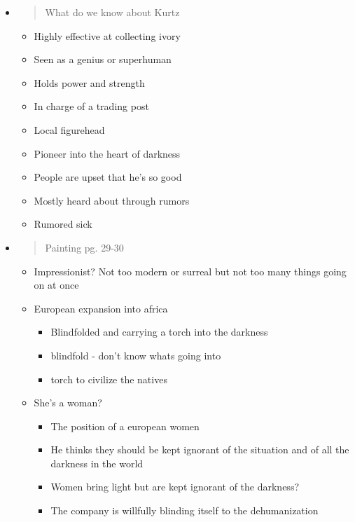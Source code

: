 \documentclass[letterpaper]{article}
\begin{document}
\begin{itemize}
\item \begin{quote}
What do we know about Kurtz
\end{quote}

\begin{itemize}
\item Highly effective at collecting ivory
\item Seen as a genius or superhuman
\item Holds power and strength
\item In charge of a trading post
\item Local figurehead
\item Pioneer into the heart of darkness
\item People are upset that he's so good
\item Mostly heard about through rumors
\item Rumored sick
\end{itemize}

\item \begin{quote}
Painting pg. 29-30
\end{quote}

\begin{itemize}
\item Impressionist? Not too modern or surreal but not too many things
going on at once
\item European expansion into africa

\begin{itemize}
\item Blindfolded and carrying a torch into the darkness
\item blindfold - don't know whats going into
\item torch to civilize the natives
\end{itemize}

\item She's a woman?

\begin{itemize}
\item The position of a european women
\item He thinks they should be kept ignorant of the situation and of all
the darkness in the world
\item Women bring light but are kept ignorant of the darkness?
\item The company is willfully blinding itself to the dehumanization
\end{itemize}


\end{itemize}
\end{itemize}
\end{document}
